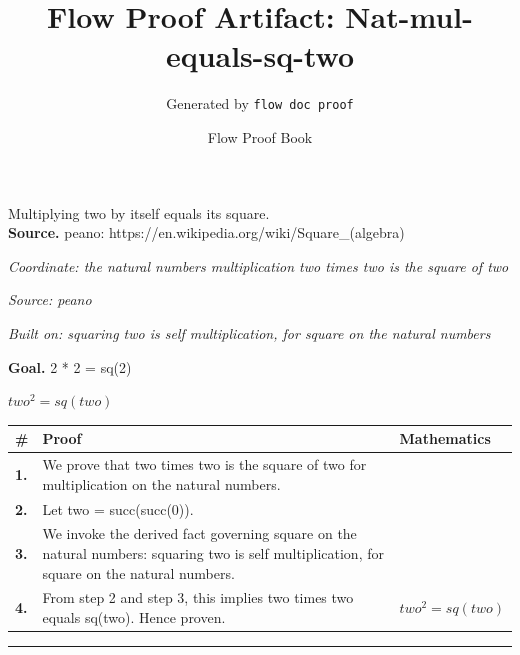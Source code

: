 \documentclass[11pt]{article}
\title{Flow Proof Artifact: Nat-mul-equals-sq-two}
\author{Generated by \texttt{flow doc proof}}
\date{Flow Proof Book}
\theoremstyle{definition}
\begin{document}
\maketitle
Multiplying two by itself equals its square.\\[0.5em]
\textbf{Source.} peano: https://en.wikipedia.org/wiki/Square\_(algebra)\\[0.5em]
\bigskip
{}\par
\smallskip\noindent\textit{Coordinate: the natural numbers \cdot multiplication \cdot two times two is the square of two}\par
\smallskip\noindent\textit{Source: peano}\par
\smallskip\noindent\textit{Built on: squaring two is self multiplication, for square on the natural numbers}\par
\medskip
\noindent\textbf{Goal.} 2 * 2 = sq(2)\par
\noindent$\displaystyle two^{2} = sq(two)$\par
\medskip
\noindent
\begin{tabular}{@{} >{\raggedright\arraybackslash}p{} >{\raggedright\arraybackslash}p{} >{\raggedleft\arraybackslash}p{} @{}}
\textbf{\#} & \textbf{Proof} & \textbf{Mathematics} \\
\midrule
\textbf{1.} & We prove that two times two is the square of two for multiplication on the natural numbers. & \\[0.45em]
\textbf{2.} & Let two = succ(succ(0)). & \\[0.45em]
\textbf{3.} & We invoke the derived fact governing square on the natural numbers: squaring two is self multiplication, for square on the natural numbers. & \\[0.45em]
\textbf{4.} & From step 2 and step 3, this implies two times two equals sq(two). Hence proven. & $\displaystyle two^{2} = sq(two)$ \\[0.45em]
\bottomrule
\end{tabular}
\label{thm:Nat-multiplication-two_times_two_is_the_square_of_two}
\par\medskip\hrule
\end{document}
